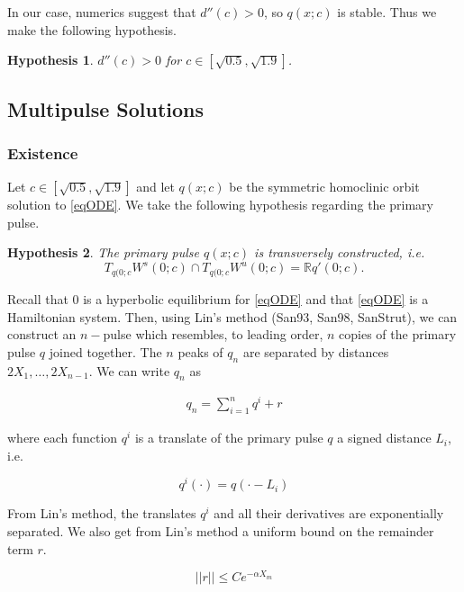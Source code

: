 \documentclass[12pt]{article}
\def\R{{\mathbb R}}
\newtheorem{hypothesis}{Hypothesis}
\begin{document}
In our case, numerics suggest that $d''(c) > 0$, so $q(x; c)$ is stable. Thus we make the following hypothesis.

\begin{hypothesis}\label{hypdccpos}
$d''(c) > 0$ for $c \in [\sqrt{0.5}, \sqrt{1.9}]$.
\end{hypothesis}


\subsection{Multipulse Solutions}

\subsubsection{Existence}

Let $c \in [\sqrt{0.5}, \sqrt{1.9}]$ and let $q(x; c)$ be the symmetric homoclinic orbit solution to \eqref{eqODE}. We take the following hypothesis regarding the primary pulse.

\begin{hypothesis}\label{transverseq}
The primary pulse $q(x; c)$ is transversely constructed, i.e. 
\[
T_{q(0; c} W^s(0; c) \cap T_{q(0; c} W^u(0; c) = \R q'(0; c).
\]
\end{hypothesis}

Recall that 0 is a hyperbolic equilibrium for \eqref{eqODE} and that \eqref{eqODE} is a Hamiltonian system. Then, using Lin's method (San93, San98, SanStrut), we can construct an $n-$pulse which resembles, to leading order, $n$ copies of the primary pulse $q$ joined together. The $n$ peaks of $q_n$ are separated by distances $2 X_1, \dots, 2 X_{n-1}$. We can write $q_n$ as 

\begin{align}\label{qn}
q_n = \sum_{i = 1}^{n} q^i + r
\end{align}

where each function $q^i$ is a translate of the primary pulse $q$ a signed distance $L_i$, i.e. 

\begin{equation}\label{qi}
q^i(\cdot) = q(\cdot - L_i)
\end{equation}

From Lin's method, the translates $q^i$ and all their derivatives are exponentially separated. We also get from Lin's method a uniform bound on the remainder term $r$.

\begin{equation}
||r|| \leq C e^{-\alpha X_m}
\end{equation}
\end{document}
